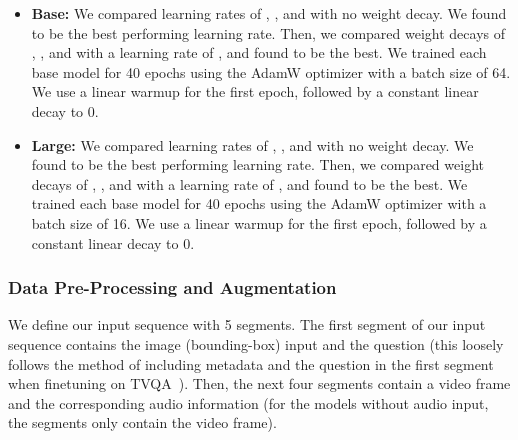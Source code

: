 \documentclass[runningheads]{llncs}
\begin{document}
\begin{itemize}
    \item \textbf{Base:} We compared learning rates of , , and  with no weight decay. We found  to be the best performing learning rate. Then, we compared weight decays of , , and  with a learning rate of , and found  to be the best. We trained each base model for 40 epochs using the AdamW optimizer with a batch size of 64. We use a linear warmup for the first epoch, followed by a constant linear decay to 0. 
    \item \textbf{Large:} We compared learning rates of , , and  with no weight decay. We found  to be the best performing learning rate. Then, we compared weight decays of , , and  with a learning rate of , and found  to be the best. We trained each base model for 40 epochs using the AdamW optimizer with a batch size of 16. We use a linear warmup for the first epoch, followed by a constant linear decay to 0. 
\end{itemize}

\subsubsection{Data Pre-Processing and Augmentation} We define our input sequence with 5 segments. The first segment of our input sequence contains the image (bounding-box) input and the question (this loosely follows the method of including metadata and the question in the first segment when finetuning on TVQA~\cite{lei2018tvqa}). Then, the next four segments contain a video frame and the corresponding audio information (for the models without audio input, the segments only contain the video frame).   
\end{document}
